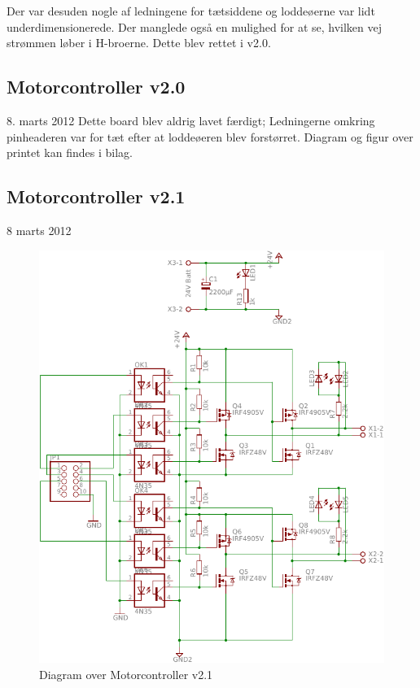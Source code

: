 \documentclass[a4paper,oneside,article,danish,table]{memoir}
\newcommand{\boarddate}[1]{\textcolor{blue!80!black}{#1}}
\begin{document}
Der var desuden nogle af ledningene for tætsiddene og loddeøerne var lidt underdimensionerede. Der manglede også en mulighed for at se, hvilken vej strømmen løber i H-broerne. Dette blev rettet i v2.0.
\subsection{Motorcontroller v2.0}
\boarddate{8. marts 2012} Dette board blev aldrig lavet færdigt; Ledningerne omkring pinheaderen var for tæt efter at loddeøeren blev forstørret. Diagram og figur over printet kan findes i bilag. 

\subsection{Motorcontroller v2.1}
\boarddate{8 marts 2012}
\begin{figure}[htbp]
  \centering
  \includegraphics[width=\textwidth]{pictures/MotorcontrollerSch2-1.pdf}
  \caption{Diagram over Motorcontroller v2.1}
  \label{fig:mosch2.1}
\end{figure}
\end{document}
